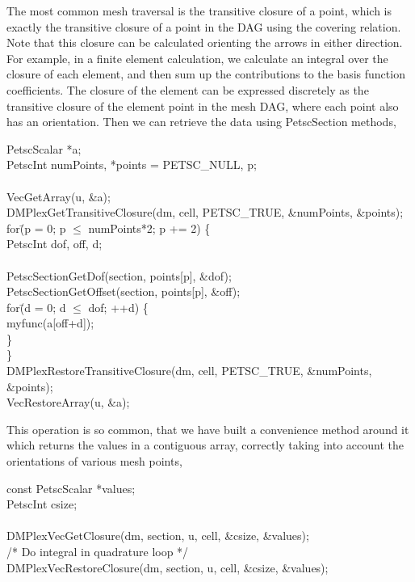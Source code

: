 {{{The most common mesh traversal is the transitive closure of a point, which is exactly the transitive closure of a point
in the DAG using the covering relation. Note that this closure can be calculated orienting the arrows in either
direction. For example, in a finite element calculation, we calculate an integral over the closure of each element, and
then sum up the contributions to the basis function coefficients. The closure of the element can be expressed discretely
as the transitive closure of the element point in the mesh DAG, where each point also has an orientation. Then we can
retrieve the data using PetscSection methods,
\begin{tabbing}
  PetscScalar *a;\\
  PetscInt     numPoints, *points = PETSC\_NULL, p;\\
\\
  VecGetArray(u, \&a);\\
  DMPlexGetTransitiveClosure(dm, cell, PETSC\_TRUE, \&numPoints, \&points);\\
  for\=(p = 0; p ${}\le{}$ numPoints*2; p += 2) \{\\
    \>PetscInt dof, off, d;\\
\\
    \>PetscSectionGetDof(section, points[p], \&dof);\\
    \>PetscSectionGetOffset(section, points[p], \&off);\\
    \>for\=(d = 0; d ${}\le{}$ dof; ++d) \{\\
      \>\>myfunc(a[off+d]);\\
    \>\}\\
  \}\\
  DMPlexRestoreTransitiveClosure(dm, cell, PETSC\_TRUE, \&numPoints, \&points);\\
  VecRestoreArray(u, \&a);
\end{tabbing}
This operation is so common, that we have built a convenience method around it which returns the values in a contiguous
array, correctly taking into account the orientations of various mesh points,
\begin{tabbing}
  const PetscScalar *values;\\
  PetscInt           csize;\\
\\
  DMPlexVecGetClosure(dm, section, u, cell, \&csize, \&values);\\
  /* Do integral in quadrature loop */\\
  DMPlexVecRestoreClosure(dm, section, u, cell, \&csize, \&values);\\

\end{tabbing}}}}
